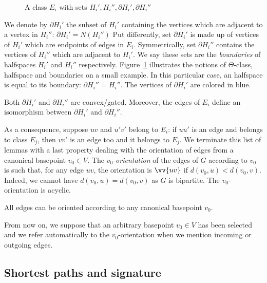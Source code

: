 \documentclass[a4paper,UKenglish,numberwithinsect,cleveref, autoref]{lipics-v2021}
\begin{document}
\begin{figure}[h]
\centering
\scalebox{0.7}{}
\caption{A class $E_i$ with sets $H_i', H_i'', \partial H_i', \partial H_i''$}
\label{fig:halfspaces}
\end{figure}

We denote by $\partial H_i'$ the subset of $H_i'$ containing the vertices which are adjacent to a vertex in $H_i''$: $\partial H_i' = N(H_i'')$ Put differently, set $\partial H_i'$ is made up of vertices of $H_i'$ which are endpoints of edges in $E_i$. Symmetrically, set $\partial H_i''$ contains the vertices of $H_i''$ which are adjacent to $H_i'$. We say these sets are the \textit{boundaries} of halfspaces $H_i'$ and $H_i''$ respectively. Figure~\ref{fig:halfspaces} illustrates the notions of $\Theta$-class, halfspace and boundaries on a small example. In this particular case, an halfspace is equal to its boundary: $\partial H_i'' = H_i''$. The vertices of $\partial H_i'$ are colored in blue.

\begin{lemma}
Both $\partial H_i'$ and $\partial H_i''$ are convex/gated. Moreover, the edges of $E_i$ define an isomorphism between $\partial H_i'$ and $\partial H_i''$.
\label{le:boundaries}
\end{lemma}


As a consequence, suppose $uv$ and $u'v'$ belong to $E_i$: if $uu'$ is an edge and belongs to class $E_j$, then $vv'$ is an edge too and it belongs to $E_j$. We terminate this list of lemmas with a last property dealing with the orientation of edges  from a canonical basepoint $v_0 \in V$. The \textit{$v_0$-orientation} of the edges of $G$ according to $v_0$ is such that, for any edge $uv$, the orientation is $\vv{uv}$ if $d(v_0,u) < d(v_0,v)$. Indeed, we cannot have $d(v_0,u) = d(v_0,v)$ as $G$ is bipartite. The $v_0$-orientation is acyclic.

\begin{lemma}
All edges can be oriented according to any canonical basepoint $v_0$.
\end{lemma}

From now on, we suppose that an arbitrary basepoint $v_0 \in V$ has been selected and we refer automatically to the $v_0$-orientation when we mention incoming or outgoing edges.

\subsection{Shortest paths and signature} \label{subsec:signature}
\end{document}
